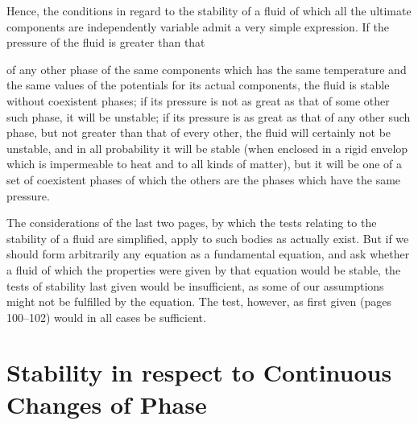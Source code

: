 \documentclass[11pt]{article}
\begin{document}
Hence, the conditions in regard to the stability of a fluid of which all the ultimate components are independently variable admit a very simple expression. If the pressure of the fluid is greater than that

of any other phase of the same components which has the same temperature and the same values of the potentials for its actual components, the fluid is stable without coexistent phases; if its pressure is not as great as that of some other such phase, it will be unstable; if its pressure is as great as that of any other such phase, but not greater than that of every other, the fluid will certainly not be unstable, and in all probability it will be stable (when enclosed in a rigid envelop which is impermeable to heat and to all kinds of matter), but it will be one of a set of coexistent phases of which the others are the phases which have the same pressure.

The considerations of the last two pages, by which the tests relating to the stability of a fluid are simplified, apply to such bodies as actually exist. But if we should form arbitrarily any equation as a fundamental equation, and ask whether a fluid of which the properties were given by that equation would be stable, the tests of stability last given would be insufficient, as some of our assumptions might not be fulfilled by the equation. The test, however, as first given (pages 100--102) would in all cases be sufficient.

\section*{Stability in respect to Continuous Changes of Phase}
\end{document}
